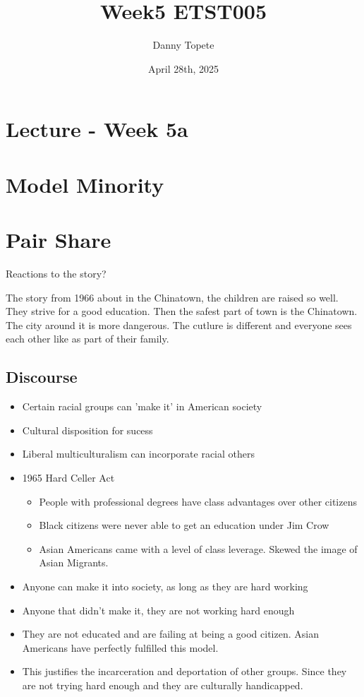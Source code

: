 \documentclass{article}
\title{Week5 ETST005}
\author{Danny Topete}
\date{April 28th, 2025}
\begin{document}
\maketitle

\section*{Lecture - Week 5a}
\section{Model Minority}

\section*{Pair Share}
Reactions to the story?

The story from 1966 about in the Chinatown, the children are
raised so well. They strive for a good education.
Then the safest part of town is the Chinatown. The city around
it is more dangerous.
The cutlure is different and everyone sees each other like
as part of their family.

\subsection{Discourse}
\begin{itemize}
  \item Certain racial groups can 'make it' in American society
  \item Cultural disposition for sucess
  \item Liberal multiculturalism can incorporate racial others
  \item 1965 Hard Celler Act
    \begin{itemize}
      \item People with professional degrees have class advantages over
        other citizens
      \item Black citizens were never able to get an education under Jim Crow
      \item Asian Americans came with a level of class leverage.
        Skewed the image of Asian Migrants.
    \end{itemize}

  \item Anyone can make it into society, as long as they are hard working
  \item Anyone that didn't make it, they are not working hard enough
  \item They are not educated and are failing at being a good citizen.
    Asian Americans have perfectly fulfilled this model.
  \item This justifies the incarceration and deportation of other groups.
    Since they are not trying hard enough and they are culturally
    handicapped.
\end{itemize}
\end{document}
